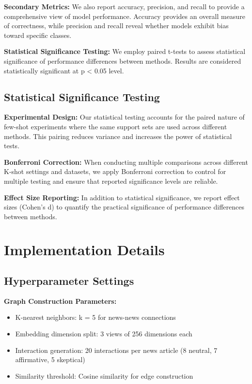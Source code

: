 \textbf{Secondary Metrics:} We also report accuracy, precision, and recall to provide a comprehensive view of model performance. Accuracy provides an overall measure of correctness, while precision and recall reveal whether models exhibit bias toward specific classes.

\textbf{Statistical Significance Testing:} We employ paired t-tests to assess statistical significance of performance differences between methods. Results are considered statistically significant at p < 0.05 level.

\subsection{Statistical Significance Testing}

\textbf{Experimental Design:} Our statistical testing accounts for the paired nature of few-shot experiments where the same support sets are used across different methods. This pairing reduces variance and increases the power of statistical tests.

\textbf{Bonferroni Correction:} When conducting multiple comparisons across different K-shot settings and datasets, we apply Bonferroni correction to control for multiple testing and ensure that reported significance levels are reliable.

\textbf{Effect Size Reporting:} In addition to statistical significance, we report effect sizes (Cohen's d) to quantify the practical significance of performance differences between methods.

\section{Implementation Details}

\subsection{Hyperparameter Settings}

\textbf{Graph Construction Parameters:}
\begin{itemize}
\item K-nearest neighbors: k = 5 for news-news connections
\item Embedding dimension split: 3 views of 256 dimensions each
\item Interaction generation: 20 interactions per news article (8 neutral, 7 affirmative, 5 skeptical)
\item Similarity threshold: Cosine similarity for edge construction
\end{itemize}

